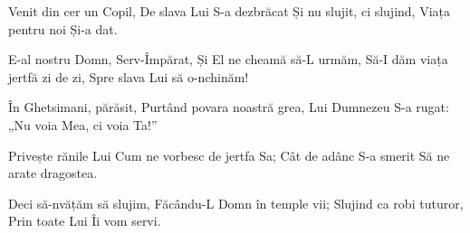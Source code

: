\beginverse
Venit din cer un Copil,
De slava Lui S-a dezbrăcat
Și nu slujit, ci slujind,
Viața pentru noi Și-a dat.
\endverse

\beginchorus
E-al nostru Domn, Serv-Împărat,
Și El ne cheamă să-L urmăm,
Să-I dăm viața jertfă zi de zi,
Spre slava Lui să o-nchinăm!
\endchorus

\beginverse
În Ghetsimani, părăsit,
Purtând povara noastră grea,
Lui Dumnezeu S-a rugat:
„Nu voia Mea, ci voia Ta!”
\endverse

\beginverse
Privește rănile Lui
Cum ne vorbesc de jertfa Sa;
Cât de adânc S-a smerit
Să ne arate dragostea.
\endverse

\beginverse
Deci să-nvățăm să slujim,
Făcându-L Domn în temple vii;
Slujind ca robi tuturor,
Prin toate Lui Îi vom servi.
\endverse
\endsong